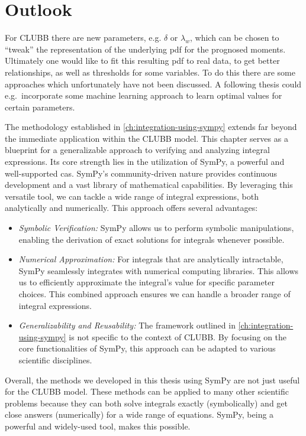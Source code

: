 \chapter{Outlook}\label{ch:outlook}

For \gls{CLUBB} there are new parameters,
e.g. $\delta$ or $\lambda_w$,
which can be chosen to \enquote{tweak} the representation of the underlying \gls{pdf} for the prognosed moments.
Ultimately one would like to fit this resulting \gls{pdf} to real data,
to get better relationships, as well as thresholds for some variables.
To do this there are some approaches which unfortunately have not been discussed.
A following thesis could e.g.\ incorporate some machine learning approach to learn optimal values for certain parameters.

The methodology established in \cref{ch:integration-using-sympy} extends far beyond the immediate application within the \gls{CLUBB} model.
This chapter serves as a blueprint for a generalizable approach to verifying and analyzing integral expressions.
Its core strength lies in the utilization of SymPy, a powerful and well-supported \gls{cas}.
SymPy's community-driven nature provides continuous development and a vast library of mathematical capabilities.
By leveraging this versatile tool,
we can tackle a wide range of integral expressions, both analytically and numerically.
This approach offers several advantages:
\begin{itemize}
    \item \emph{Symbolic Verification:}
    SymPy allows us to perform symbolic manipulations, enabling the derivation of exact solutions for integrals whenever possible.
    \item \emph{Numerical Approximation:}
    For integrals that are analytically intractable, SymPy seamlessly integrates with numerical computing libraries.
    This allows us to efficiently approximate the integral's value for specific parameter choices.
    This combined approach ensures we can handle a broader range of integral expressions.
    \item \emph{Generalizability and Reusability:}
    The framework outlined in \cref{ch:integration-using-sympy} is not specific to the context of \gls{CLUBB}.
    By focusing on the core functionalities of SymPy, this approach can be adapted to various scientific disciplines.
\end{itemize}
Overall, the methods we developed in this thesis using SymPy are not just useful for the \gls{CLUBB} model.
These methods can be applied to many other scientific problems
because they can both solve integrals exactly (symbolically) and get close answers (numerically) for a wide range of equations.
SymPy, being a powerful and widely-used tool, makes this possible.